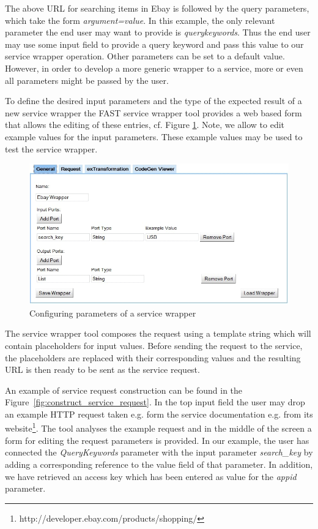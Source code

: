 The above URL for searching items in Ebay is followed by the query parameters, which take the form \textit{argument=value}. In this example, the only relevant parameter the end user may want to provide is \emph{querykeywords}. Thus the end user may use some input field to provide a query keyword and pass this value to our service wrapper operation. Other parameters can be set to a default value. However, in order to develop a more generic wrapper to a service, more or even all parameters might be passed by the user.

To define the desired input parameters and the type of the expected result of a new service wrapper the FAST service wrapper tool provides a web based form that allows the editing of these entries, cf. Figure \ref{fig:construct_pre_post_conditions}. Note, we allow to edit example values for the input parameters. These example values may be used to test the service wrapper. 

\begin{figure}
  \begin{center} \includegraphics[width=\linewidth]{images/ServiceWrapperToolGVSWithPortDefinitions.png}
    \caption{Configuring parameters of a service wrapper}
    \label{fig:construct_pre_post_conditions}
  \end{center}
\end{figure}

The service wrapper tool composes the request using a template string which will contain placeholders for input values. Before sending the request to the service, the placeholders are replaced with their corresponding values and the resulting URL is then ready to be sent as the service request.

An example of service request construction can be found in the Figure~\ref{fig:construct_service_request}. In the top input field the user may drop an example HTTP request taken e.g. form the service documentation e.g. from its website\footnote{http://developer.ebay.com/products/shopping/}. The tool analyses the example request and in the middle of the screen a form for editing the request parameters is provided. In our example, the user has connected the \textit{QueryKeywords} parameter with the input parameter \textit{search\_key} by adding a corresponding reference to the value field of that parameter. In addition, we have retrieved an access key which has been entered as value for the \textit{appid} parameter.

